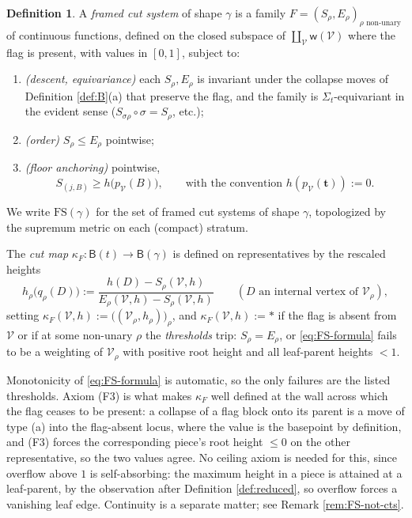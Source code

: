 \documentclass[12pt]{amsart}
\theoremstyle{definition}
\newtheorem{definition}[subsection]{Definition}
\theoremstyle{remark}
\newcommand{\Cal}[1]{\mathcal{#1}}
\newcommand{\BC}{\mathsf{B}}                     %
\newcommand{\wt}{\mathsf{w}}                     %
\newcommand{\basept}{\ast}
\begin{document}
\begin{definition}\label{def:FS}
A \emph{framed cut system} of shape $\gamma$ is a family $F = (S_\rho, E_\rho)_{\rho \text{ non-unary}}$ of continuous functions, defined on the closed subspace of $\coprod_{\Cal{V}}\wt(\Cal{V})$ where the flag is present, with values in $[0,1]$, subject to:
\begin{enumerate}[label=(F\arabic*)]
    \item \emph{(descent, equivariance)} each $S_\rho, E_\rho$ is invariant under the collapse moves of Definition \ref{def:B}(a) that preserve the flag, and the family is $\Sigma_t$-equivariant in the evident sense ($S_{\sigma\rho}\circ \sigma = S_{\rho}$, etc.);
    \item \emph{(order)} $S_\rho \leq E_\rho$ pointwise;
    \item \emph{(floor anchoring)} pointwise,
    \[ S_{(j,B)} \geq h\big(p_{\Cal{V}}(B)\big), \quad\quad \text{with the convention } h(p_{\Cal{V}}(\mathbf{t})) := 0.\]
\end{enumerate}
We write $\mathrm{FS}(\gamma)$ for the set of framed cut systems of shape $\gamma$, topologized by the supremum metric on each (compact) stratum.

The \emph{cut map} $\kappa_F\colon \BC(t)\to \BC(\gamma)$ is defined on representatives by the rescaled heights
\begin{equation}\label{eq:FS-formula}
    h_\rho\big(q_\rho(D)\big) := \frac{h(D) - S_\rho(\Cal{V},h)}{E_\rho(\Cal{V},h) - S_\rho(\Cal{V},h)} \quad\quad (D \text{ an internal vertex of } \Cal{V}_\rho),
\end{equation}
setting $\kappa_F(\Cal{V},h) := \big( (\Cal{V}_\rho, h_\rho) \big)_{\rho}$, and $\kappa_F(\Cal{V},h) := \basept$ if the flag is absent from $\Cal{V}$ or if at some non-unary $\rho$ the \emph{thresholds} trip: $S_\rho = E_\rho$, or \eqref{eq:FS-formula} fails to be a weighting of $\Cal{V}_\rho$ with positive root height and all leaf-parent heights $<1$.
\end{definition}

Monotonicity of \eqref{eq:FS-formula} is automatic, so the only failures are the listed thresholds. Axiom (F3) is what makes $\kappa_F$ well defined at the wall across which the flag ceases to be present: a collapse of a flag block onto its parent is a move of type (a) into the flag-absent locus, where the value is the basepoint by definition, and (F3) forces the corresponding piece's root height $\leq 0$ on the other representative, so the two values agree. No ceiling axiom is needed for this, since overflow above $1$ is self-absorbing: the maximum height in a piece is attained at a leaf-parent, by the observation after Definition \ref{def:reduced}, so overflow forces a vanishing leaf edge. Continuity is a separate matter; see Remark \ref{rem:FS-not-cts}.
\end{document}
